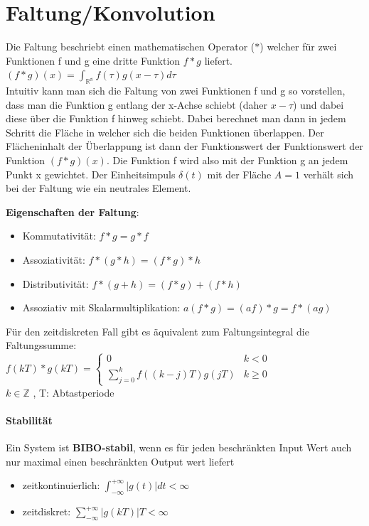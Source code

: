 \documentclass[12pt,a4paper]{article}
\newcommand{\nl}{\\[0.1cm]}
\begin{document}
\section{Faltung/Konvolution}
Die Faltung beschriebt einen mathematischen Operator ($\ast$) welcher für zwei Funktionen f und g eine dritte Funktion $f \ast g$ liefert.\nl
$\displaystyle (f\ast g)(x) = \int_{\mathbb{R^n}} f(\tau) g(x-\tau)d\tau$\nl
Intuitiv kann man sich die Faltung von zwei Funktionen f und g so vorstellen, dass man die Funktion g entlang der x-Achse schiebt (daher $x-\tau$) und dabei diese über die Funktion f hinweg schiebt. Dabei berechnet man dann in jedem Schritt die Fläche in welcher sich die beiden Funktionen überlappen. Der Flächeninhalt der Überlappung ist dann der Funktionswert der Funktionswert der Funktion $(f \ast g) (x)$. Die Funktion f wird also mit der Funktion g an jedem Punkt x gewichtet. Der Einheitsimpuls $\delta(t)$ mit der Fläche $A=1$ verhält sich bei der Faltung wie ein neutrales Element.
\flushleft

\textbf{Eigenschaften der Faltung}:
\begin{itemize}
\item Kommutativität: $f \ast g = g \ast f$
\item Assoziativität: $f \ast (g \ast h) = (f \ast g) \ast h$
\item Distributivität: $f \ast (g+h) = (f \ast g) + (f \ast h)$
\item Assoziativ mit Skalarmultiplikation: $a(f\ast g) = (af)\ast g = f \ast (ag)$
\end{itemize}
\flushleft
Für den zeitdiskreten Fall gibt es äquivalent zum Faltungsintegral die Faltungssumme:\nl
$\displaystyle f(kT) \ast g(kT) = \begin{cases} 0 & k<0 \\
\displaystyle \sum_{j=0}^k f((k-j)T)g(jT) & k \geq 0
\end{cases}$\nl
$k \in \mathbb{Z}$ , T: Abtastperiode

\paragraph{Stabilität}
Ein System ist \textbf{BIBO-stabil}, wenn es für jeden beschränkten Input Wert auch nur maximal einen beschränkten 
Output wert liefert\nl
\begin{itemize}
\item zeitkontinuierlich: $\displaystyle \int_{-\infty}^{+\infty} |g(t)|dt < \infty$
\item zeitdiskret: $\displaystyle \sum_{-\infty}^{+\infty} |g(kT)|T < \infty$
\end{itemize}
\end{document}
